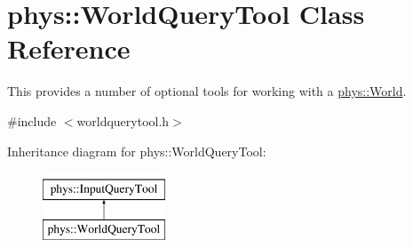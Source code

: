 \hypertarget{classphys_1_1WorldQueryTool}{
\section{phys::WorldQueryTool Class Reference}
\label{d8/d69/classphys_1_1WorldQueryTool}
}


This provides a number of optional tools for working with a \hyperlink{classphys_1_1World}{phys::World}.  




{\ttfamily \#include $<$worldquerytool.h$>$}

Inheritance diagram for phys::WorldQueryTool:\begin{figure}[H]
\begin{center}
\leavevmode
\includegraphics[height=2.000000cm]{d8/d69/classphys_1_1WorldQueryTool}
\end{center}
\end{figure}
